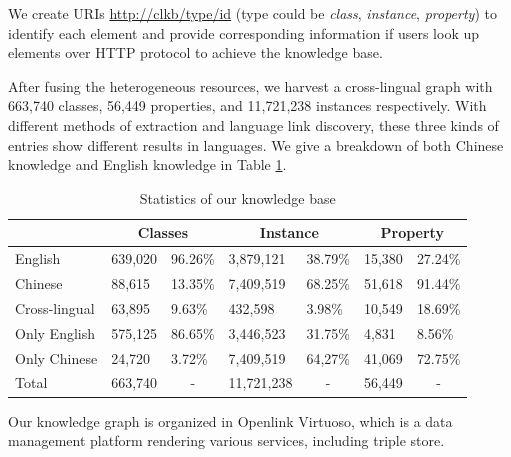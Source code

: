 \documentclass[runningheads,a4paper]{llncs}
\begin{document}
We create URIs \url{http://clkb/type/id} (type could be \textit{class}, \textit{instance}, \textit{property}) to identify each element and provide corresponding information if users look up elements over HTTP protocol to achieve the knowledge base.

After fusing the heterogeneous resources, we harvest a cross-lingual graph with 663,740 classes, 56,449 properties, and 11,721,238 instances respectively. With different methods of extraction and language link discovery, these three kinds of entries show different results in languages. We give a breakdown of both Chinese knowledge and English knowledge in Table \ref{tab:kb-result}.
\vspace{-0.5cm}
\begin{table}[ht]
\small
\centering
\caption{Statistics of our knowledge base}
\label{tab:kb-result}
\begin{tabular}{|l|l|l|l|l|l|l|}
\hline
\multicolumn{1}{|c|}{} & \multicolumn{2}{c|}{Classes}     & \multicolumn{2}{c|}{Instance}                   & \multicolumn{2}{c|}{Property}    \\ \hline
English                & 639,020 & 96.26\%                & 3,879,121              & 38.79\%                & 15,380  & 27.24\%                \\ \hline
Chinese                & 88,615  & 13.35\%                & 7,409,519              & 68.25\%                & 51,618  & 91.44\%                \\ \hline
Cross-lingual          & 63,895  & 9.63\%                 & 432,598                & 3.98\%                 & 10,549  & 18.69\%                \\ \hline
Only English           & 575,125 & 86.65\%                & 3,446,523              & 31.75\%                 & 4,831   & 8.56\%    \\ \hline
Only Chinese           & 24,720  & 3.72\%                 & 7,409,519              & 64,27\%                  & 41,069  & 72.75\%   \\ \hline
Total                  & 663,740 & \multicolumn{1}{c|}{-} & 11,721,238             & \multicolumn{1}{c|}{-} & 56,449  & \multicolumn{1}{c|}{-} \\ \hline
\end{tabular}
\end{table}
\vspace{-0.5cm}

Our knowledge graph is organized in Openlink Virtuoso, which is a data management platform rendering various services, including triple store.
\end{document}
